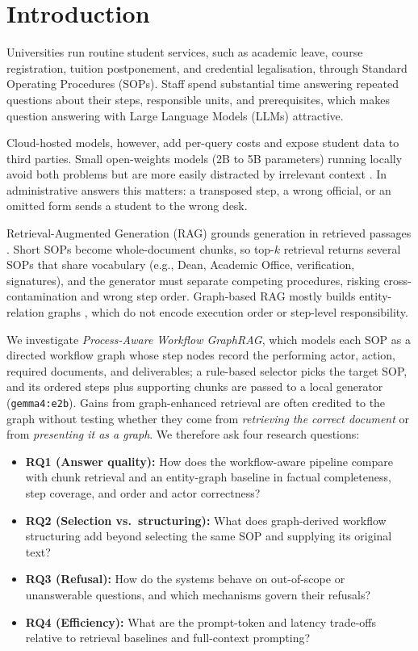 \documentclass[a4paper,fleqn]{cas-dc}
\begin{document}
\section{Introduction}
\label{sec:intro}

Universities run routine student services, such as academic leave, course registration, tuition postponement, and credential legalisation, through Standard Operating Procedures (SOPs). Staff spend substantial time answering repeated questions about their steps, responsible units, and prerequisites, which makes question answering with Large Language Models (LLMs) attractive.

Cloud-hosted models, however, add per-query costs and expose student data to third parties. Small open-weights models (2B to 5B parameters) running locally avoid both problems but are more easily distracted by irrelevant context \cite{liu2024lost}. In administrative answers this matters: a transposed step, a wrong official, or an omitted form sends a student to the wrong desk.

Retrieval-Augmented Generation (RAG) grounds generation in retrieved passages \cite{lewis2020rag,gao2023ragsurvey}. Short SOPs become whole-document chunks, so top-$k$ retrieval returns several SOPs that share vocabulary (e.g., Dean, Academic Office, verification, signatures), and the generator must separate competing procedures, risking cross-contamination and wrong step order. Graph-based RAG \cite{peng2024graphragsurvey,pan2024unifying} mostly builds entity-relation graphs \cite{edge2024graphrag,guo2024lightrag,gutierrez2024hipporag}, which do not encode execution order or step-level responsibility.

We investigate \emph{Process-Aware Workflow GraphRAG}, which models each SOP as a directed workflow graph \cite{dumas2018fundamentals} whose step nodes record the performing actor, action, required documents, and deliverables; a rule-based selector picks the target SOP, and its ordered steps plus supporting chunks are passed to a local generator (\texttt{gemma4:e2b}). Gains from graph-enhanced retrieval are often credited to the graph without testing whether they come from \emph{retrieving the correct document} or from \emph{presenting it as a graph}. We therefore ask four research questions:
\begin{itemize}[leftmargin=*]
\item \textbf{RQ1 (Answer quality):} How does the workflow-aware pipeline compare with chunk retrieval and an entity-graph baseline in factual completeness, step coverage, and order and actor correctness?
\item \textbf{RQ2 (Selection vs.\ structuring):} What does graph-derived workflow structuring add beyond selecting the same SOP and supplying its original text?
\item \textbf{RQ3 (Refusal):} How do the systems behave on out-of-scope or unanswerable questions, and which mechanisms govern their refusals?
\item \textbf{RQ4 (Efficiency):} What are the prompt-token and latency trade-offs relative to retrieval baselines and full-context prompting?
\end{itemize}
\end{document}
